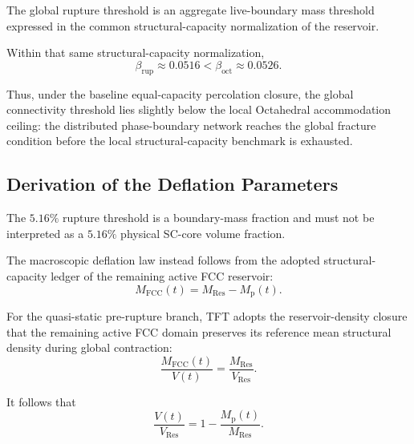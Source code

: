 The global rupture threshold is an aggregate live-boundary mass threshold
expressed in the common structural-capacity normalization of the reservoir.

Within that same structural-capacity normalization,
\begin{equation}
    \beta_{\mathrm{rup}}
    \approx
    0.0516
    <
    \beta_{\mathrm{oct}}
    \approx
    0.0526.
\end{equation}

Thus, under the baseline equal-capacity percolation closure, the global
connectivity threshold lies slightly below the local Octahedral accommodation
ceiling: the distributed phase-boundary network reaches the global fracture
condition before the local structural-capacity benchmark is exhausted.


\subsection{Derivation of the Deflation Parameters}
\label{subsec:deflation_parameters}

The \(5.16\%\) rupture threshold is a boundary-mass fraction and must not be
interpreted as a \(5.16\%\) physical SC-core volume fraction.

The macroscopic deflation law instead follows from the adopted
structural-capacity ledger of the remaining active FCC reservoir:
\begin{equation}
    M_{\mathrm{FCC}}(t)
    =
    M_{\mathrm{Res}}
    -
    M_{\mathrm p}(t).
\end{equation}

For the quasi-static pre-rupture branch, TFT adopts the reservoir-density
closure that the remaining active FCC domain preserves its reference mean
structural density during global contraction:
\begin{equation}
    \frac{
        M_{\mathrm{FCC}}(t)
    }{
        V(t)
    }
    =
    \frac{
        M_{\mathrm{Res}}
    }{
        V_{\mathrm{Res}}
    }.
\end{equation}

It follows that
\begin{equation}
    \frac{
        V(t)
    }{
        V_{\mathrm{Res}}
    }
    =
    1
    -
    \frac{
        M_{\mathrm p}(t)
    }{
        M_{\mathrm{Res}}
    }.
\end{equation}

